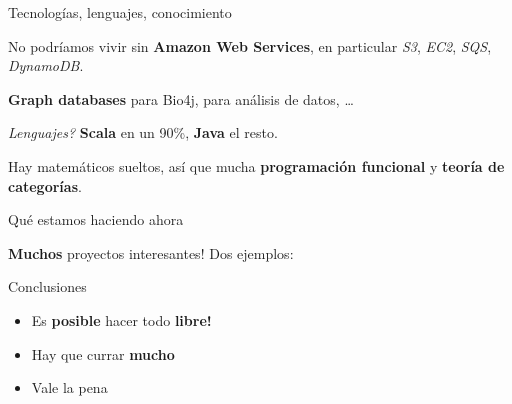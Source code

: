 \documentclass[12pt,compress]{beamer}
\let\OldHref\href
\renewcommand{\href}[2]{\OldHref[pdfnewwindow]{#1}{{\textbf{#2}}}}
\providecommand{\tightlist}{%
\setlength{\itemsep}{0pt}\setlength{\parskip}{0pt}}
\begin{document}
\begin{frame}{Tecnologías, lenguajes, conocimiento}

No podríamos vivir sin \textbf{Amazon Web Services}, en particular
\emph{S3}, \emph{EC2}, \emph{SQS}, \emph{DynamoDB}.

\textbf{Graph databases} para Bio4j, para análisis de datos, \ldots{}

\emph{Lenguajes?} \textbf{Scala} en un 90\%, \textbf{Java} el resto.

Hay matemáticos sueltos, así que mucha \textbf{programación funcional} y
\textbf{teoría de categorías}.

\end{frame}

\begin{frame}{Qué estamos haciendo ahora}

\textbf{Muchos} proyectos interesantes! Dos ejemplos:


\end{frame}

\begin{frame}{Conclusiones}

\begin{itemize}[<+->]
\tightlist
\item
  Es \textbf{posible} hacer todo \textbf{libre!}
\item
  Hay que currar \textbf{mucho}
\item
  Vale la pena
\end{itemize}

\end{frame}
\end{document}

